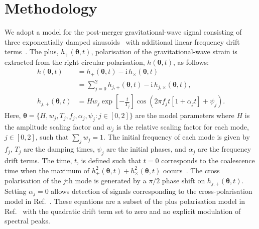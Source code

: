 \documentclass[../Thesis.tex]{subfiles}
\begin{document}
    \section{Methodology}\label{sec:methodology2}
    We adopt a model for the post-merger gravitational-wave signal consisting of three exponentially damped sinusoids~\cite{Bauswein2016} with additional linear frequency drift terms~\cite{Bose2018}. 
    The plus, $h_{+}(\boldsymbol{\theta},t)$, polarisation of the gravitational-wave strain is extracted from the right circular polarisation, $h(\boldsymbol{\theta},t)$,  as follows:
\begin{align}
        h(\boldsymbol{\theta},t) & =  h_{+}(\boldsymbol{\theta},t) - \mathrm{i}\, h_{\times}(\boldsymbol{\theta},t) \label{eq:htotal2}\\
        & =  \sum_{j=0}^{2}h_{j,+}(\boldsymbol{\theta},t) - \mathrm{i}\, h_{j,\times}(\boldsymbol{\theta},t),\label{eq:hsum2} \\
        h_{j,+}(\boldsymbol{\theta},t) & = 
        H w_j \exp\left[-\frac{t}{T_j}\right] \cos \left(2\pi f_j t\left[1+\alpha_j t\right]+\psi_j \right). \label{eq:hmode2}
\end{align}
        Here, ${\boldsymbol{\theta} = \{H,w_j,T_j,f_j,\alpha_j,\psi_j :  j \in [0,2] \}}$ are the model parameters where $H$ is the amplitude scaling factor and $w_j$ is the relative scaling factor for each mode, $j\in [0,2]$, such that $\sum_j w_j = 1$. 
        The initial frequency of each mode is given by $f_j$, $T_j$ are the damping times, $\psi_j$ are the initial phases, and $\alpha_j$ are the frequency drift terms. 
        The time, $t$, is defined such that $t=0$ corresponds to the coalescence time when the maximum of $h_+^2(\boldsymbol{\theta},t)+h_\times^2(\boldsymbol{\theta},t)$ occurs~\cite[e.g.,][]{Read2013,Takami2015,Rezzolla2016,Easter2019}.
        The cross polarisation of the $j$th mode is generated by a $\pi/2$ phase shift on $h_{j,+}(\boldsymbol{\theta},t)$.
        Setting $\alpha_j=0$ allows detection of signals corresponding to the cross-polarisation model in Ref.~\cite{Bauswein2016}. 
        These equations are a subset of the plus polarisation model in Ref.~\cite{Bose2018} with the quadratic drift term set to zero and no explicit modulation of spectral peaks.
        \par
        
\end{document}
